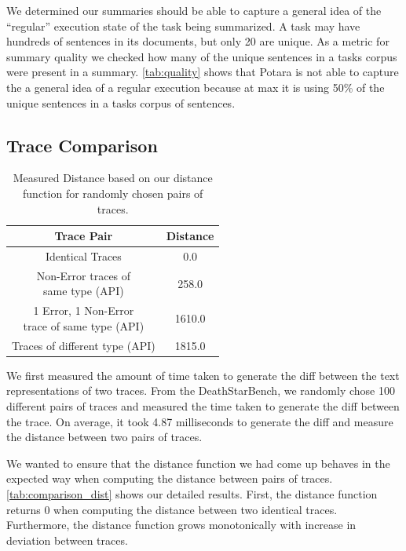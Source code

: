  We determined our summaries should be able to capture a general idea of the ``regular'' execution state of the task being summarized. 
A task may have hundreds of sentences in its documents, but only 20 are unique. As a metric for summary quality
we checked how many of the unique sentences in a tasks corpus were present in a summary. \autoref{tab:quality} shows that Potara is not able to capture 
the a general idea of a regular execution because at max it is using 50\% of the unique sentences in a tasks corpus of sentences.

\subsection{Trace Comparison}

\begin{table}[]
    \begin{tabular}{|c|c|}
    \hline
    Trace Pair                              & Distance \\
    \hline
    \hline
    Identical Traces                        & 0.0      \\
    \hline
    \makecell{Non-Error traces of \\ same type (API)}     & 258.0    \\
    \hline
    \makecell{1 Error, 1 Non-Error \\ trace of same type (API)} & 1610.0  \\
    \hline
    Traces of different type (API)          & 1815.0   \\
    \hline
    \end{tabular}
    \caption{Measured Distance based on our distance function for randomly chosen pairs of traces.}
    \label{tab:comparison_dist}
\end{table}

 We first measured the amount of time taken to generate the diff between the text representations
of two traces. From the DeathStarBench, we randomly chose 100 different pairs of traces and measured the time taken
to generate the diff between the trace. On average, it took 4.87 milliseconds to generate the diff and measure the distance
between two pairs of traces.

 We wanted to ensure that the distance function we had come up behaves in the expected way
when computing the distance between pairs of traces. \autoref{tab:comparison_dist} shows our detailed results. First,
the distance function returns 0 when computing the distance between two identical traces. Furthermore, the distance function
grows monotonically with increase in deviation between traces. 

